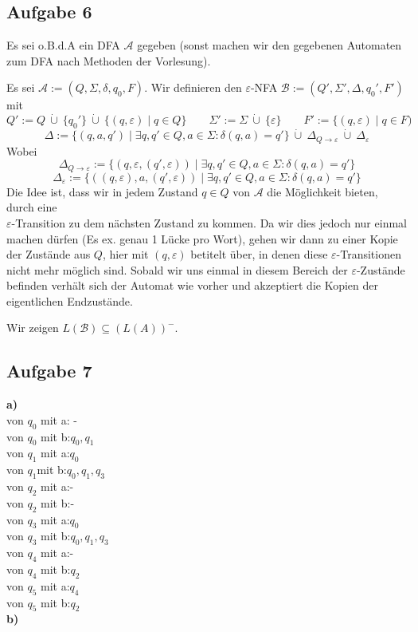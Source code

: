 \documentclass[a4paper,graphics,11pt]{article}
\newcommand{\aufgabe}[1]{\subsection*{Aufgabe #1}}
\begin{document}
\newpage
\aufgabe{6}
Es sei o.B.d.A ein DFA $\mathcal{A}$ gegeben (sonst machen wir den gegebenen Automaten zum DFA nach Methoden
der Vorlesung).

Es sei $\mathcal{A} := (Q, \Sigma, \delta, q_0, F)$.
Wir definieren den $\varepsilon$-NFA $\mathcal{B} := (Q', \Sigma', \Delta, q_0', F')$ mit
$$
    Q' := Q\ \dot\cup\ \{q_0'\}\ \dot\cup\ \{(q, \varepsilon) \mid q \in Q\}
    \qquad \Sigma' := \Sigma\ \dot\cup\ \{\varepsilon\}
    \qquad F' := \{(q, \varepsilon) \mid q \in F)
$$$$
    \Delta := \{(q, a, q') \mid \exists q,q' \in Q, a \in \Sigma : \delta(q, a) = q'\}\ \dot\cup\ \Delta_{Q \to \varepsilon}\ \dot\cup\ \Delta_\varepsilon
$$
Wobei
$$
    \Delta_{Q \to \varepsilon} := \{(q, \varepsilon, (q', \varepsilon)) \mid \exists q,q' \in Q, a \in \Sigma : \delta(q, a) = q'\}
$$$$
    \Delta_\varepsilon := \{((q, \varepsilon), a, (q', \varepsilon)) \mid \exists q,q' \in Q, a \in \Sigma : \delta(q, a) = q'\}
$$
Die Idee ist, dass wir in jedem Zustand $q \in Q$ von $\mathcal{A}$ die Möglichkeit bieten, durch eine\\
$\varepsilon$-Transition zu dem nächsten Zustand zu kommen. Da wir dies jedoch nur einmal machen dürfen
(Es ex. genau 1 Lücke pro Wort), gehen wir dann zu einer Kopie der Zustände aus $Q$, hier mit $(q, \varepsilon)$
betitelt über, in denen diese $\varepsilon$-Transitionen nicht mehr möglich sind. Sobald wir uns einmal in diesem
Bereich der $\varepsilon$-Zustände befinden verhält sich der Automat wie vorher und akzeptiert die Kopien der 
eigentlichen Endzustände.

Wir zeigen $L(\mathcal{B}) \subseteq (L(A))^-$.

\newpage
\aufgabe{7}
\textbf{a)}\\
von $ q_0$ mit a: -\\
von $q_0$ mit b:$q_0,q_1$\\
von $q_1$ mit a:$q_0$\\
von $q_1 $mit b:$q_0,q_1,q_3$\\
von $q_2$ mit a:-\\
von $q_2$ mit b:-\\
von $q_3$ mit a:$q_0$\\
von $q_3$ mit b:$q_0,q_1,q_3$\\
von $q_4$ mit a:-\\
von $q_4$ mit b:$q_2$\\
von $q_5$ mit a:$q_4$\\
von $q_5$ mit b:$q_2$\\

\textbf{b)}\\
\end{document}
